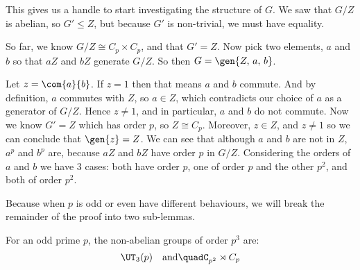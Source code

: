 This gives us a handle to start investigating the structure of \(G\).
We saw that \(G/Z\) is abelian, so \(G' \leqslant Z\), but because \(G'\) is non-trivial, we must have equality.

So far, we know \(G/Z \cong C_p \times C_p\), and that \(G' = Z\).
Now pick two elements, \(a\) and \(b\) so that \(aZ\) and \(bZ\) generate \(G/Z\).
So then \(G = \gen{Z,\,a,\,b}\).

Let \(z = \com{a}{b}\).
If \(z = 1\) then that means \(a\) and \(b\) commute.
And by definition, \(a\) commutes with \(Z\), so \(a \in Z\), which contradicts our choice of \(a\) as a generator of
\(G/Z\).
Hence \(z \neq 1\), and in particular, \(a\) and \(b\) do not commute.
Now we know \(G' = Z\) which has order \(p\), so \(Z \cong C_p\).
Moreover, \(z \in Z\), and \(z \neq 1\) so we can conclude that \(\gen{z} = Z\).
We can see that although \(a\) and \(b\) are not in \(Z\), \(a^p\) and \(b^p\) are, because \(aZ\) and \(bZ\) have order
\(p\) in \(G/Z\).
Considering the orders of \(a\) and \(b\) we have 3 cases: both have order \(p\), one of order \(p\) and the other
    \(p^2\), and both of order \(p^2\).

Because when \(p\) is odd or even have different behaviours, we will break the remainder of the proof into two
    sub-lemmas.

\begin{lemma}
    For an odd prime \(p\), the non-abelian groups of order \(p^3\) are:
    \[%
        \UT_3(p) \quad \text{and} \quad%
        C_{p^2} \rtimes C_p
    \]
\end{lemma}

